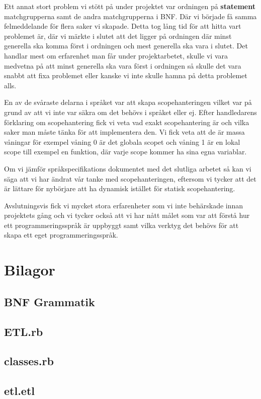 \documentclass{TDP019mall}
\begin{document}
Ett annat stort problem vi stött på under projektet var ordningen på \textbf{statement} matchgrupperna samt de andra matchgrupperna i BNF. Där vi började få samma
 felmeddelande för flera saker vi skapade. Detta tog lång tid för att hitta vart problemet är, där vi märkte i slutet att det ligger på ordningen där minst 
 generella ska komma först i ordningen och mest generella ska vara i slutet. Det handlar mest om erfarenhet man får under projektarbetet, skulle vi vara medvetna 
 på att minst generella ska vara först i ordningen så skulle det vara snabbt att fixa problemet eller kanske vi inte skulle hamna på detta problemet alls. 


En av de svåraste delarna i språket var att skapa scopehanteringen vilket var på grund av att vi inte var säkra om det behövs i språket eller ej. Efter handledarens 
förklaring om scopehantering fick vi veta vad exakt scopehantering är och vilka saker man måste tänka för att implementera den. Vi fick veta att de är massa våningar 
för exempel våning 0 är det globala scopet och våning 1 är en lokal scope till exempel en funktion, där varje scope kommer ha sina egna variablar. 


Om vi jämför språkspecifikations dokumentet med det slutliga arbetet så kan vi säga att vi har ändrat vår tanke med scopehanteringen, eftersom vi tycker att det 
är lättare för nybörjare att ha dynamisk istället för statisk scopehantering. 


Avslutningsvis fick vi mycket stora erfarenheter som vi inte behärskade innan projektets gång och vi tycker också att vi har nått målet som var att förstå 
hur ett programmeringsspråk är uppbyggt samt vilka verktyg det behövs för att skapa ett eget programmeringsspråk. 


        
\newpage
\section{Bilagor}

\subsection{BNF Grammatik}


\newpage
\subsection{ETL.rb}


\newpage
\subsection{classes.rb}


\newpage
\subsection{etl.etl}

\end{document}
